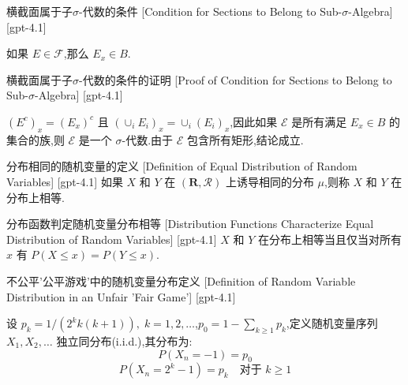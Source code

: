 \documentclass[UTF8]{ctexart}
\begin{document}
    
    
    \begin{lma}
        {横截面属于子$\sigma$-代数的条件}
        [Condition for Sections to Belong to Sub-$\sigma$-Algebra]
        [gpt-4.1]
        
如果 $E \in \mathcal{F}$,那么 $E_x \in B$.

    \end{lma}
    
    
    
    \begin{prf}
        {横截面属于子$\sigma$-代数的条件的证明}
        [Proof of Condition for Sections to Belong to Sub-$\sigma$-Algebra]
        [gpt-4.1]
        
$(E^{c})_{x} = (E_{x})^{c}$ 且 $(\cup_{i} E_{i})_{x} = \cup_{i} (E_{i})_{x}$,因此如果 $\mathcal{E}$ 是所有满足 $E_{x} \in B$ 的集合的族,则 $\mathcal{E}$ 是一个 $\sigma$-代数.由于 $\mathcal{E}$ 包含所有矩形,结论成立.

    \end{prf}
    
    
    
    \begin{dfn}
        {分布相同的随机变量的定义}
        [Definition of Equal Distribution of Random Variables]
        [gpt-4.1]
        如果 $X$ 和 $Y$ 在 $(\mathbf{R}, \mathcal{R})$ 上诱导相同的分布 $\mu$,则称 $X$ 和 $Y$ 在分布上相等.
    \end{dfn}
    
    
    
    \begin{thm}
        {分布函数判定随机变量分布相等}
        [Distribution Functions Characterize Equal Distribution of Random Variables]
        [gpt-4.1]
        $X$ 和 $Y$ 在分布上相等当且仅当对所有 $x$ 有 $P(X \leq x) = P(Y \leq x)$.
    \end{thm}
    
    
    
    \begin{dfn}
        {不公平'公平游戏'中的随机变量分布定义}
        [Definition of Random Variable Distribution in an Unfair 'Fair Game']
        [gpt-4.1]
        
设 $p_{k} = 1 / (2^{k} k(k+1)),\; k = 1, 2, \dots$,$p_{0} = 1 - \sum_{k \geq 1} p_{k}$,定义随机变量序列 $X_1, X_2, \dots$ 独立同分布(i.i.d.),其分布为:
\[
P(X_{n} = -1) = p_{0}
\]
\[
P(X_{n} = 2^{k} - 1) = p_{k} \quad \text{对于 } k \geq 1
\]

    \end{dfn}
    
\end{document}
